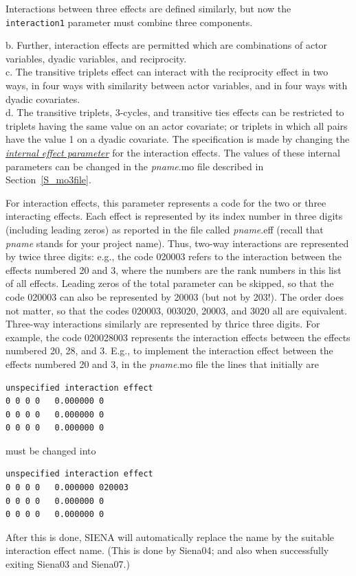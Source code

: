 \documentclass[a4paper,fleqn,11pt]{article}
\newcommand{\+}{\, + \,}
\newcommand{\SI}{{\sf SIENA }}
\begin{document}
Interactions between three effects are defined similarly,
but now the \texttt{interaction1} parameter must combine three components.


\iffalse

  b. Further, interaction effects are permitted
  which are combinations of actor variables, dyadic variables, and reciprocity.\\
  c. The transitive triplets effect can interact with the reciprocity effect in two ways,
  in four ways with similarity between actor variables, and in four ways with dyadic covariates.\\
  d. The transitive triplets, 3-cycles, and transitive ties effects
  can be restricted to triplets having the same value on an actor covariate;
  or triplets in which all pairs have the value 1 on a dyadic covariate.
The specification is made by changing the
\hyperlink{T_effpar}{\emph{internal effect parameter}}
for the interaction effects.
The values of these internal parameters
can be changed in the \textsf{{\em pname}.mo} file
described in Section~\ref{S_mo3file}.

For interaction effects, this parameter represents a code
for the two or three interacting effects.
Each effect is represented by its index number
in three digits (including leading zeros)
as reported in the file called \textsf{{\em pname}.eff}
(recall that \textsf{{\em pname}} stands for your project name).
Thus, two-way interactions are represented by twice three digits: e.g., the code 020003
refers to the interaction between the effects numbered 20 and 3,
where the numbers are the rank numbers in this list of all effects.
Leading zeros of the total parameter can be skipped, so that the code 020003
can also be represented by 20003 (but not by 203!). The order does not matter, so that
the codes 020003, 003020, 20003, and 3020 all are equivalent.
Three-way interactions similarly are represented by thrice three digits.
For example, the code 020028003 represents the interaction effects
between the effects numbered 20, 28, and 3.
E.g., to implement the interaction effect between the effects numbered 20 and 3,
in the \textsf{{\em pname}.mo} file the lines that initially are
\begin{verbatim}
unspecified interaction effect
0 0 0 0   0.000000 0
0 0 0 0   0.000000 0
0 0 0 0   0.000000 0
\end{verbatim}
must be changed into
\begin{verbatim}
unspecified interaction effect
0 0 0 0   0.000000 020003
0 0 0 0   0.000000 0
0 0 0 0   0.000000 0
\end{verbatim}
After this is done, \SI will automatically replace the name
by the suitable interaction effect name.
(This is done by \textsf{Siena04};
and also when successfully exiting \textsf{Siena03} and \textsf{Siena07}.)
\medskip
\end{document}
